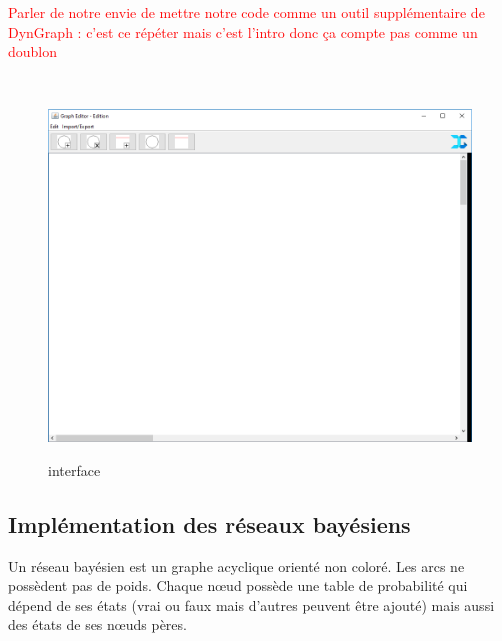 \documentclass[conference]{IEEEtran}
\begin{document}
\textcolor{red}{Parler de notre envie de mettre notre code comme un outil supplémentaire de DynGraph : c'est ce répéter mais c'est l'intro donc ça compte pas comme un doublon}

\

\begin{figure}[h]
\begin{center}
\includegraphics[scale=0.30]{Dyngraph.png}\\
\caption{interface}
\label{fig 1}
\end{center}
\end{figure}

\subsection{Implémentation des réseaux bayésiens}

Un réseau bayésien est un graphe acyclique orienté non coloré. Les arcs ne possèdent pas de poids. Chaque nœud possède une table de probabilité qui dépend de ses états (vrai ou faux mais d'autres peuvent être ajouté) mais aussi des états de ses nœuds pères. \\
\end{document}
